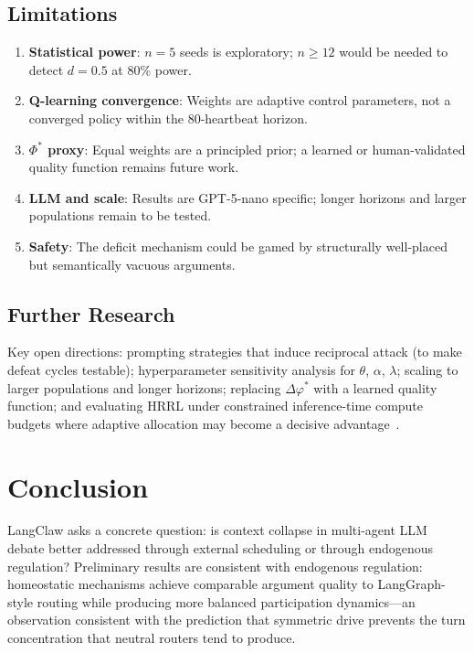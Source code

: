 \documentclass{llncs}
\begin{document}
\subsection{Limitations}

\begin{enumerate}
    \item \textbf{Statistical power}: $n=5$ seeds is exploratory; $n \geq 12$
          would be needed to detect $d = 0.5$ at 80\% power.
    \item \textbf{Q-learning convergence}: Weights are adaptive control
          parameters, not a converged policy within the 80-heartbeat horizon.
    \item \textbf{$\Phi^*$ proxy}: Equal weights are a principled prior;
          a learned or human-validated quality function remains future work.
    \item \textbf{LLM and scale}: Results are GPT-5-nano specific; longer
          horizons and larger populations remain to be tested.
    \item \textbf{Safety}: The deficit mechanism could be gamed by
          structurally well-placed but semantically vacuous arguments.
\end{enumerate}

\subsection{Further Research}

Key open directions: prompting strategies that induce reciprocal attack
(to make defeat cycles testable); hyperparameter sensitivity analysis for
$\theta$, $\alpha$, $\lambda$; scaling to larger populations and longer
horizons; replacing $\Delta\varphi^*$ with a learned quality function;
and evaluating HRRL under constrained inference-time compute budgets where
adaptive allocation may become a decisive advantage~\parencite{snell2024scaling}.

\section{Conclusion}
\label{sec:conclusion}

LangClaw asks a concrete question: is context collapse in multi-agent LLM
debate better addressed through external scheduling or through endogenous
regulation? Preliminary results are consistent with endogenous regulation:
homeostatic mechanisms achieve comparable argument quality to LangGraph-style
routing while producing more balanced participation dynamics---an observation
consistent with the prediction that symmetric drive prevents the turn
concentration that neutral routers tend to produce.
\end{document}
